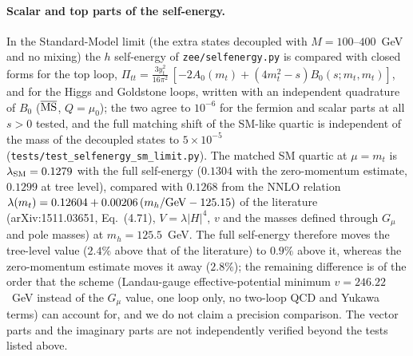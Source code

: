 \documentclass[twocolumn,epjc3]{svjour3}
\begin{document}
\paragraph{Scalar and top parts of the self-energy.} In the Standard-Model limit (the extra states decoupled with $M=100$--$400$~GeV and no mixing) the $h$ self-energy of \texttt{zee/selfenergy.py} is compared with closed forms for the top loop, $\Pi_{tt}=\frac{3y_t^2}{16\pi^2}\,[-2A_0(m_t)+(4m_t^2-s)B_0(s;m_t,m_t)]$, and for the Higgs and Goldstone loops, written with an independent quadrature of $B_0$ ($\overline{\rm MS}$, $Q=\mu_0$); the two agree to $10^{-6}$ for the fermion and scalar parts at all $s>0$ tested, and the full matching shift of the SM-like quartic is independent of the mass of the decoupled states to $5\times10^{-5}$ (\texttt{tests/test\_selfenergy\_sm\_limit.py}). The matched SM quartic at $\mu=m_t$ is $\lambda_{\rm SM}=0.1279$ with the full self-energy ($0.1304$ with the zero-momentum estimate, $0.1299$ at tree level), compared with $0.1268$ from the NNLO relation $\lambda(m_t)=0.12604+0.00206\,(m_h/{\rm GeV}-125.15)$ of the literature (arXiv:1511.03651, Eq.~(4.71), $V=\lambda|H|^4$, $v$ and the masses defined through $G_\mu$ and pole masses) at $m_h=125.5$~GeV. The full self-energy therefore moves the tree-level value ($2.4\%$ above that of the literature) to $0.9\%$ above it, whereas the zero-momentum estimate moves it away ($2.8\%$); the remaining difference is of the order that the scheme (Landau-gauge effective-potential minimum $v=246.22$~GeV instead of the $G_\mu$ value, one loop only, no two-loop QCD and Yukawa terms) can account for, and we do not claim a precision comparison. The vector parts and the imaginary parts are not independently verified beyond the tests listed above.
\end{document}
